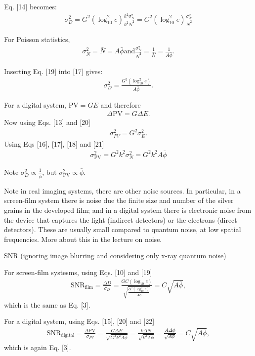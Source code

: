 \documentclass[mphy386-notes.tex]{subfiles}
\begin{document}
Eq. [14] becomes:
\begin{align}
  \sigma_D^2 = G^2(\log_{10}^2 e ) \frac{k^2 \sigma_N^2}{k^2\bar{N}^2} = G^2(\log^2_{10}e)\frac{\sigma_N^2}{\bar{N}^2}
\end{align}

For Poisson statistics,
\begin{align}
  \sigma_N^2 = \bar{N} = A\bar{\phi} \text{and}
  \frac{\sigma^2_N}{\bar{N}^2} = \frac{1}{\bar{N}} = \frac{1}{A\bar{\phi}}. 
\end{align}

Inserting Eq. [19] into [17] gives:
\begin{align}
  \sigma_D^2 = \frac{G^2(\log^2_{10} e)}{A\bar{\phi}}.
\end{align}

For a digital system, $\text{PV} = GE$ and therefore
\begin{align}
  \Delta\text{PV} = G\Delta E. 
\end{align}
Now using Eqs. [13] and [20]
\begin{align}
  \sigma_{PV}^2 = G^2\sigma_E^2.
\end{align}
Using Eqs [16], [17], [18] and [21]
\begin{align}
  \sigma_{\text{PV}}^2 = G^2k^2\sigma_N^2 = G^2k^2A\bar{\phi}
\end{align}

Note $\sigma_D^2 \propto \frac{1}{\bar{\phi}}$, but $\sigma_{\text{PV}}^2 \propto \bar{\phi}$.

Note in real imaging systems, there are other noise sources. In particular, in
a screen-film system there is noise due the finite size and number of the silver
grains in the developed film; and in a digital system there is electronic noise
from the device that captures the light (indirect detectors) or the electrons
(direct detectors). These are usually small compared to quantum noise, at low
spatial frequencies. More about this in the lecture on noise.

SNR (ignoring image blurring and considering only x-ray quantum noise)

For screen-film systesms, using Eqs. [10] and [19]
\begin{align}
  \text{SNR}_{\text{film}} = \frac{\Delta D}{\sigma_D} = \frac{GC(\log_{10}e)}{\sqrt{\frac{G^2(\log_{10}^2e)}{A\bar{\phi}}}} = C\sqrt{A\bar{\phi}},
\end{align}
which is the same as Eq. [3]. 

For a digital system, using Eqs. [15], [20] and [22]
\begin{align}
  \text{SNR}_{\text{digital}} = \frac{\Delta \text{PV}}{\sigma_{PV}} = \frac{G\Delta E}{\sqrt{G^2 k^2 A\phi}} = \frac{k\Delta N}{\sqrt{k^2 A\phi}} = \frac{A\Delta \phi}{\sqrt{A\phi}} = C\sqrt{A\bar{\phi}},
\end{align}
which is again Eq. [3].
\end{document}
